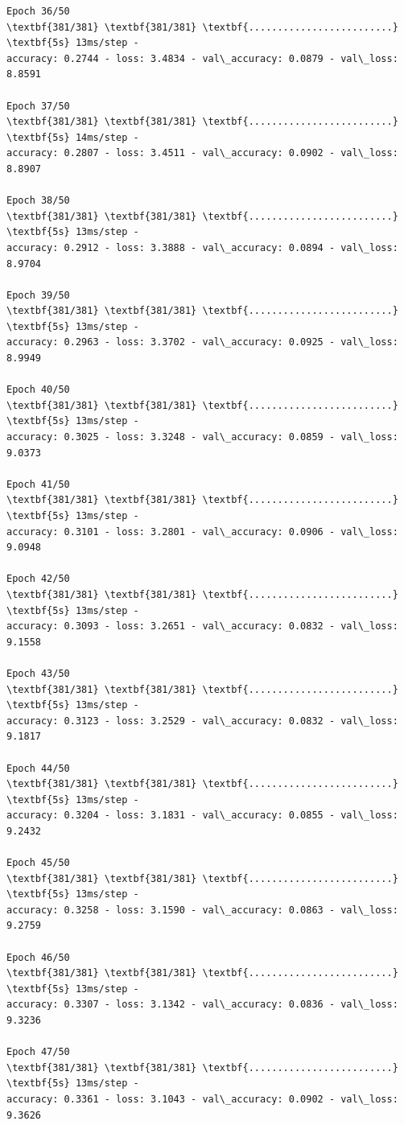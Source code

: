 \documentclass[11pt]{article}
\begin{document}
\begin{tcolorbox}[breakable, size=fbox, boxrule=1pt, pad at break*=1mm,colback=cellbackground, colframe=cellborder]
\begin{Verbatim}[commandchars=\\\{\}]
Epoch 36/50
\textbf{381/381} \textbf{381/381} \textbf{.........................} \textbf{5s} 13ms/step -
accuracy: 0.2744 - loss: 3.4834 - val\_accuracy: 0.0879 - val\_loss: 8.8591

Epoch 37/50
\textbf{381/381} \textbf{381/381} \textbf{.........................} \textbf{5s} 14ms/step -
accuracy: 0.2807 - loss: 3.4511 - val\_accuracy: 0.0902 - val\_loss: 8.8907

Epoch 38/50
\textbf{381/381} \textbf{381/381} \textbf{.........................} \textbf{5s} 13ms/step -
accuracy: 0.2912 - loss: 3.3888 - val\_accuracy: 0.0894 - val\_loss: 8.9704

Epoch 39/50
\textbf{381/381} \textbf{381/381} \textbf{.........................} \textbf{5s} 13ms/step -
accuracy: 0.2963 - loss: 3.3702 - val\_accuracy: 0.0925 - val\_loss: 8.9949

Epoch 40/50
\textbf{381/381} \textbf{381/381} \textbf{.........................} \textbf{5s} 13ms/step -
accuracy: 0.3025 - loss: 3.3248 - val\_accuracy: 0.0859 - val\_loss: 9.0373

Epoch 41/50
\textbf{381/381} \textbf{381/381} \textbf{.........................} \textbf{5s} 13ms/step -
accuracy: 0.3101 - loss: 3.2801 - val\_accuracy: 0.0906 - val\_loss: 9.0948

Epoch 42/50
\textbf{381/381} \textbf{381/381} \textbf{.........................} \textbf{5s} 13ms/step -
accuracy: 0.3093 - loss: 3.2651 - val\_accuracy: 0.0832 - val\_loss: 9.1558

Epoch 43/50
\textbf{381/381} \textbf{381/381} \textbf{.........................} \textbf{5s} 13ms/step -
accuracy: 0.3123 - loss: 3.2529 - val\_accuracy: 0.0832 - val\_loss: 9.1817

Epoch 44/50
\textbf{381/381} \textbf{381/381} \textbf{.........................} \textbf{5s} 13ms/step -
accuracy: 0.3204 - loss: 3.1831 - val\_accuracy: 0.0855 - val\_loss: 9.2432

Epoch 45/50
\textbf{381/381} \textbf{381/381} \textbf{.........................} \textbf{5s} 13ms/step -
accuracy: 0.3258 - loss: 3.1590 - val\_accuracy: 0.0863 - val\_loss: 9.2759

Epoch 46/50
\textbf{381/381} \textbf{381/381} \textbf{.........................} \textbf{5s} 13ms/step -
accuracy: 0.3307 - loss: 3.1342 - val\_accuracy: 0.0836 - val\_loss: 9.3236

Epoch 47/50
\textbf{381/381} \textbf{381/381} \textbf{.........................} \textbf{5s} 13ms/step -
accuracy: 0.3361 - loss: 3.1043 - val\_accuracy: 0.0902 - val\_loss: 9.3626


\end{Verbatim}
\end{tcolorbox}
\end{document}
